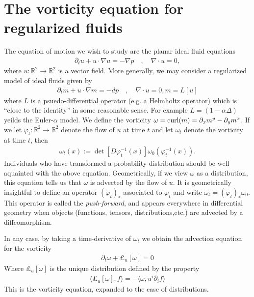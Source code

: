 \documentclass[12pt]{amsart}
\newcommand{\R}{\ensuremath{\mathbb{R}}}
\begin{document}
\section{The vorticity equation for regularized fluids}
\label{sec:vorticity}
The equation of motion we wish to study are the planar ideal fluid equations
\begin{align*}
  \partial_t u + u \cdot \nabla u = - \nabla p \quad, \quad \nabla \cdot u = 0,
\end{align*}
where $u:\R^2 \to \R^2$ is a vector field.
More generally, we may consider a regularized model of ideal fluids given by
\begin{align*}
  \partial_t m + u \cdot \nabla m = - dp \quad,\quad \nabla \cdot u = 0, m = L[u]
\end{align*}
where $L$ is a psuedo-differential operator (e.g. a Helmholtz operator)
which is ``close to the identity'' in some reasonable sense.
For example $L = (1-\alpha \Delta)$ yeilds the Euler-$\alpha$ model.
We define the vorticity $\omega = {\rm curl}(m) = \partial_x m^y - \partial_y m^x$.
If we let $\varphi_t : \R^2 \to \R^2$ denote the flow of $u$ at time $t$
and let $\omega_t$ denote the vorticity at time $t$, then
\begin{align*}
  \omega_t (x):= \det[ D\varphi_t^{-1}(x) ] \omega_0(\varphi_t^{-1}(x)).
\end{align*}
Individuals who have transformed a probability distribution should be well aquainted with the above
equation.
Geometrically, if we view $\omega$ as a distribution,
this equation tells us that $\omega$ is advected by the flow of $u$.
It is geometrically insightful to define an operator $(\varphi_t)_*$
associated to $\varphi_t$ and write $\omega_t = (\varphi_t)_* \omega_0$.
This operator is called the \emph{push-forward}, and appears everywhere in differential geometry
when objects (functions, tensors, distributions,etc.) are advected by a diffeomorphism.

In any case, by taking a time-derivative of $\omega_t$ we obtain the advection equation for the vorticity
\begin{align*}
  \partial_t \omega + \pounds_u [\omega] = 0
\end{align*}
Where $\pounds_u[\omega]$ is the unique distribution defined by the property
\begin{align*}
  \langle \pounds_u[\omega] , f \rangle = - \langle \omega , u^i \partial_i f \rangle
\end{align*}
This is the vorticity equation, expanded to the case of distributions.
\end{document}
